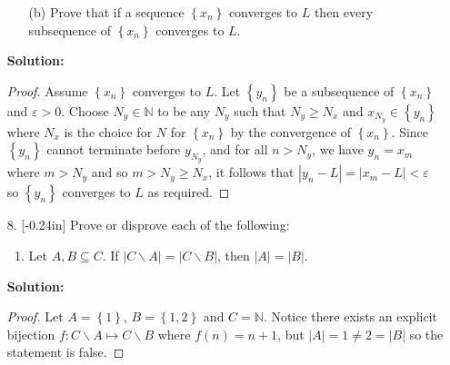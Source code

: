 \documentclass[letterpaper,12pt]{article}
\newcommand{\set}[1]{\left\{ #1 \right\}}
\theoremstyle{definition}
\begin{document}
\pagebreak
\begin{enumerate}
    \item[] \begin{enumerate}
        \item[(b)] Prove that if a sequence $\set{x_n}$ converges to $L$ then every subsequence of $\set{x_n}$ converges to $L$.
    \end{enumerate}
    \begin{mdframed}
        \textbf{Solution:} \begin{proof}
            Assume $\set{x_n}$ converges to $L$. Let $\set{y_n}$ be a subsequence of $\set{x_n}$ and $\varepsilon > 0$. Choose $N_y \in \mathbb{N}$ to be any $N_y$ such that $N_y \geq N_x$ and $x_{N_y} \in \set{y_n}$ where $N_x$ is the choice for $N$ for $\set{x_n}$ by the convergence of $\set{x_n}$. Since $\set{y_n}$ cannot terminate before $y_{N_y}$, and for all $n > N_y$, we have $y_n = x_m$ where $m > N_y$ and so $m > N_y \geq N_x$, it follows that $|y_n - L| = |x_m - L|<\varepsilon$ so $\set{y_n}$ converges to $L$ as required.
        \end{proof}
    \end{mdframed}
\end{enumerate}
\pagebreak
\begin{enumerate}
    \item[8.] \reversemarginpar{}[-0.24in] Prove or disprove each of the following: \begin{enumerate}
        \item Let $A,B \subseteq C$. If $|C \backslash A| = |C \backslash B|$, then $|A| = |B|$.
    \end{enumerate}
     \begin{mdframed}
            \textbf{Solution:}
            \renewcommand{\proofname}{Disproof}
            \begin{proof}
                 Let $A  = \set{1}$, $B = \set{1,2}$ and $C = \mathbb{N}$. Notice there exists an explicit bijection $f: C \backslash A \mapsto  C \backslash B$ where $f(n) = n+1$, but $|A| = 1 \neq 2 = |B|$ so the statement is false.
            \end{proof}
        \end{mdframed}
\end{enumerate}
\pagebreak
\end{document}
